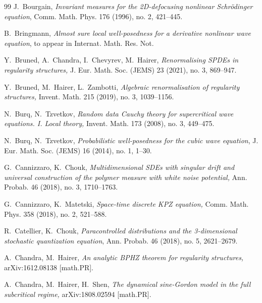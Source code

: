 \documentclass[%
11pt,  reqno]{amsart}
\newcommand{\1}{\hspace{0.2mm}\text{I}\hspace{0.2mm}}
\numberwithin{equation}{section}
\numberwithin{theorem}{section}
\begin{document}
\begin{thebibliography}{99}
J.~Bourgain, 
{\it Invariant measures for the 2D-defocusing nonlinear Schr\"odinger equation}, 
Comm. Math. Phys. 176 (1996), no. 2, 421--445. 

B.~Bringmann,
{\it 
Almost sure local well-posedness for a derivative nonlinear wave equation}, 
to appear in Internat. Math. Res. Not.


Y.~Bruned, A.~Chandra, I.~Chevyrev, M.~Hairer,
{\it Renormalising {SPDEs} in regularity structures,}
J. Eur. Math. Soc.
(JEMS) 23 (2021), no. 3, 869--947.

Y.~Bruned, M.~Hairer, L.~Zambotti,
{\it Algebraic renormalisation of regularity structures,}
 Invent. Math. 215 (2019), no. 3, 1039--1156.




N.~Burq, N.~Tzvetkov,
{\it Random data Cauchy theory for supercritical wave equations. I. Local theory,}
Invent. Math. 173 (2008), no. 3, 449--475.



N.~Burq, N.~Tzvetkov,
{\it Probabilistic well-posedness for the cubic wave equation},
 J. Eur. Math. Soc. (JEMS)  16 (2014), no. 1, 1--30.

G.~Cannizzaro,  K.~Chouk,
{\it Multidimensional {SDE}s with singular drift and universal
  construction of the polymer measure with white noise potential,}
Ann. Probab. 46 (2018), no. 3, 1710--1763.



G.~Cannizzaro,  K.~Matetski,
{\it Space-time discrete {KPZ} equation,}
 Comm. Math. Phys. 358 (2018), no. 2, 521--588.



R.~Catellier, K.~Chouk, 
{\it Paracontrolled distributions and the 3-dimensional stochastic quantization equation},
  Ann. Probab. 46 (2018), no. 5, 2621--2679.

A.~Chandra,  M.~Hairer,
{\it An analytic {BPHZ} theorem for regularity structures,}
arXiv:1612.08138 [math.PR].


A.~Chandra, M.~Hairer,  H.~Shen,
{\it
 The dynamical sine-{Gordon} model in the full subcritical regime,}
arXiv:1808.02594 [math.PR].





\end{thebibliography}
\end{document}
